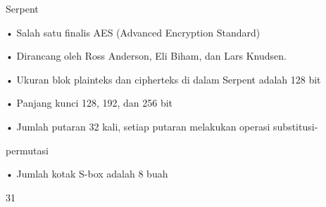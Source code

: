 \documentclass{article}
\begin{document}

Serpent

• Salah satu finalis AES (Advanced Encryption Standard)

• Dirancang oleh Ross Anderson, Eli Biham, dan Lars Knudsen.

• Ukuran blok plainteks dan cipherteks di dalam Serpent adalah 128 bit

• Panjang kunci 128, 192, dan 256 bit

• Jumlah putaran 32 kali, setiap putaran melakukan operasi substitusi-

permutasi

• Jumlah kotak S-box adalah 8 buah 

31
\end{document}
